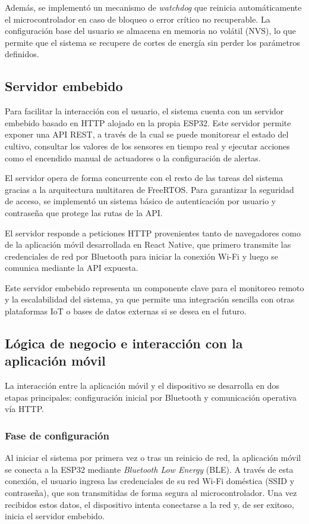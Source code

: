 Además, se implementó un mecanismo de \textit{watchdog} que reinicia automáticamente el microcontrolador en caso de bloqueo o error crítico no recuperable. La configuración base del usuario se almacena en memoria no volátil (NVS), lo que permite que el sistema se recupere de cortes de energía sin perder los parámetros definidos.

\subsection{Servidor embebido}
Para facilitar la interacción con el usuario, el sistema cuenta con un servidor embebido basado en HTTP alojado en la propia ESP32. Este servidor permite exponer una API REST, a través de la cual se puede monitorear el estado del cultivo, consultar los valores de los sensores en tiempo real y ejecutar acciones como el encendido manual de actuadores o la configuración de alertas.

El servidor opera de forma concurrente con el resto de las tareas del sistema gracias a la arquitectura multitarea de FreeRTOS. Para garantizar la seguridad de acceso, se implementó un sistema básico de autenticación por usuario y contraseña que protege las rutas de la API.

El servidor responde a peticiones HTTP provenientes tanto de navegadores como de la aplicación móvil desarrollada en React Native, que primero transmite las credenciales de red por Bluetooth para iniciar la conexión Wi-Fi y luego se comunica mediante la API expuesta.

Este servidor embebido representa un componente clave para el monitoreo remoto y la escalabilidad del sistema, ya que permite una integración sencilla con otras plataformas IoT o bases de datos externas si se desea en el futuro.

\subsection{Lógica de negocio e interacción con la aplicación móvil}
La interacción entre la aplicación móvil y el dispositivo se desarrolla en dos etapas principales: configuración inicial por Bluetooth y comunicación operativa vía HTTP.

\subsubsection{Fase de configuración}
Al iniciar el sistema por primera vez o tras un reinicio de red, la aplicación móvil se conecta a la ESP32 mediante \textit{Bluetooth Low Energy} (BLE). A través de esta conexión, el usuario ingresa las credenciales de su red Wi-Fi doméstica (SSID y contraseña), que son transmitidas de forma segura al microcontrolador. Una vez recibidos estos datos, el dispositivo intenta conectarse a la red y, de ser exitoso, inicia el servidor embebido.

